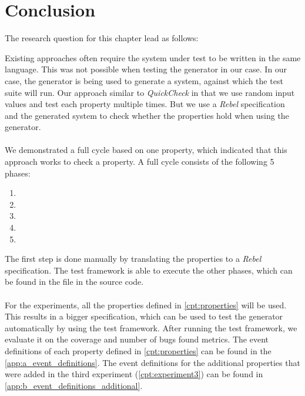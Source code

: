\section{Conclusion}
The research question for this chapter lead as follows:
\begin{quote}
  \rqTwo{}
\end{quote}
Existing approaches often require the system under test to be written in the
same language. This was not possible when testing the generator in our case. In
our case, the generator is being used to generate a system, against which the
test suite will run. Our approach similar to \textit{QuickCheck} in that we use
random input values and test each property multiple times. But we use a
\textit{Rebel} specification and the generated system to check whether the
properties hold when using the generator.\\
\\
We demonstrated a full cycle based on one property, which indicated that this
approach works to check a property. A full cycle consists of the following 5
phases:
\begin{enumerate}
\item \tfPhaseOne{}
\item \tfPhaseTwo{}
\item \tfPhaseThree{}
\item \tfPhaseFour{}
\item \tfPhaseFive{}
\end{enumerate}
The first step is done manually by translating the properties to a
\textit{Rebel} specification. The test framework is able to execute the other
phases, which can be found in the  file in the source code.\\
\\
For the experiments, all the properties defined in \autoref{cpt:properties}
will be used. This results in a bigger specification, which can be used to test
the generator automatically by using the test framework. After running the test
framework, we evaluate it on the coverage and number of bugs found metrics. The
event definitions of each property defined in \autoref{cpt:properties} can be
found in the \autoref{app:a_event_definitions}. The event definitions for the
additional properties that were added in the third experiment
(\autoref{cpt:experiment3}) can be found in
\autoref{app:b_event_definitions_additional}.

